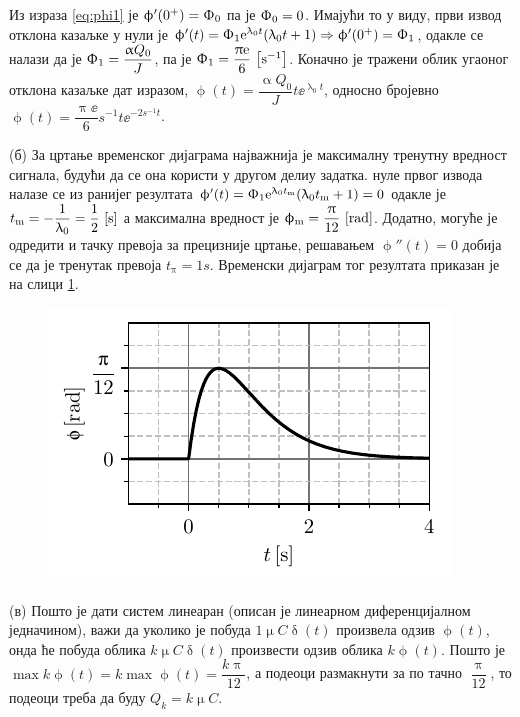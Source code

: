 Из израза \eqref{eq:phi1} је $\upphi'(0^+) = \Upphi_0$ па је 
$\Upphi_0 = 0$. Имајући то у виду, први извод отклона казаљке у нули је 
$\upphi'(t) = \Upphi_1 {\rm e}^{\uplambda_0 t}( \uplambda_0 t + 1 ) \Rightarrow 
\upphi'(0^+) = \Upphi_1
$, одакле се налази да је  
$\Upphi_1 = \dfrac{\upalpha Q_0}{J}$, па је 
$\Upphi_1 =  \dfrac{\uppi {\rm e}}{6} \,\left[\mathrm{s^{-1}}\right]$. Коначно је тражени облик угаоног отклона казаљке 
дат изразом, $\upphi(t) = \dfrac{\upalpha Q_0}{J} t \ee^{\uplambda_0 t}$, односно бројевно 
$\upphi(t) = \dfrac{\uppi\ee}{6}\unit{s^{-1}} t 
\ee^{-2\unit{s^{-1}} t}$.  


(б) За цртање временског дијаграма најважнија је максималну тренутну вредност сигнала, будући
да се она користи у другом делиу задатка. 
нуле првог извода налазе се из ранијег резултата 
$\upphi'(t) = \Upphi_1 {\rm e}^{\uplambda_0 t_{\rm m}} (\uplambda_0 t_{\rm m} + 1) = 0$ 
одакле је $t_{\rm m} = -\dfrac{1}{\uplambda_0} = \dfrac{1}{2}\,\left[\mathrm{s}\right]$ а максимална 
вредност је $\upphi_{\rm m} = \dfrac{\uppi}{12}\,\left[\mathrm{rad}\right]$. Додатно, могуће је одредити 
и тачку превоја за прецизније цртање, решавањем $\upphi''(t) = 0$ добија се да је тренутак превоја
$t_{\uppi} = 1\unit{s}$. Временски дијаграм тог резултата приказан је на слици 
\ref{fig:\ID.3}.

\begin{figure}[ht!]
    \centering
    \includegraphics[scale = 1]{fig/BG_plot.pdf}
    \caption{}
    \label{fig:\ID.3}
\end{figure}

(в) Пошто је дати систем линеаран (описан је линеарном диференцијалном једначином), 
важи да уколико је побуда $1\unit{\upmu C} \updelta(t)$ произвела одзив 
$\upphi(t)$, онда ће побуда облика $k \unit{\upmu C} \updelta(t)$ произвести одзив
облика $k \upphi(t)$. Пошто је $\max k\upphi(t) = k \max \upphi(t) = \dfrac{k\uppi}{12}$,
а подеоци размакнути за по тачно $\dfrac{\uppi}{12}$, то подеоци треба да буду 
${Q_k = k\unit{\upmu C}}$.

\vfill
